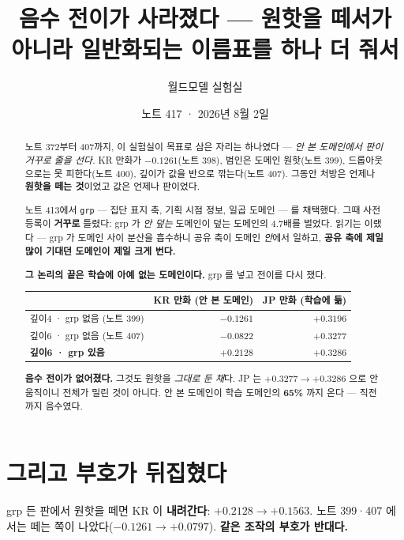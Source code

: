 \documentclass[11pt]{article}
\begin{document}
\title{음수 전이가 사라졌다 --- 원핫을 떼서가 아니라 일반화되는 이름표를 하나 더 줘서}
\author{월드모델 실험실}
\date{노트 417 · 2026년 8월 2일}
\maketitle

\begin{abstract}
노트 372부터 407까지, 이 실험실이 목표로 삼은 자리는 하나였다 --- \emph{안 본
도메인에서 판이 거꾸로 줄을 선다.} KR 만화가 $-0.1261$(노트 398), 범인은
도메인 원핫(노트 399), 드롭아웃으로는 못 피한다(노트 400), 깊이가 값을 반으로
깎는다(노트 407). 그동안 처방은 언제나 \textbf{원핫을 떼는 것}이었고 값은
언제나 판이었다.

노트 413에서 \texttt{grp} --- 집단 표지 축, 기획 시점 정보, 일곱 도메인 ---
를 채택했다. 그때 사전 등록이 \textbf{거꾸로} 틀렸다: grp 가 \emph{안 덮는}
도메인이 덮는 도메인의 4.7배를 벌었다. 읽기는 이랬다 --- grp 가 도메인 사이
분산을 흡수하니 공유 축이 도메인 \emph{안}에서 일하고, \textbf{공유 축에
제일 많이 기대던 도메인이 제일 크게 번다.}

\textbf{그 논리의 끝은 학습에 아예 없는 도메인이다.} grp 를 넣고 전이를
다시 쟀다.

\begin{center}
\begin{tabular}{lrr}
\hline
 & KR 만화 (\textbf{안 본 도메인}) & JP 만화 (학습에 듦) \\
\hline
깊이4 · grp 없음 (노트 399) & $-0.1261$ & $+0.3196$ \\
깊이6 · grp 없음 (노트 407) & $-0.0822$ & $+0.3277$ \\
\textbf{깊이6 · grp 있음} & $\mathbf{+0.2128}$ & $+0.3286$ \\
\hline
\end{tabular}
\end{center}

\textbf{음수 전이가 없어졌다.} 그것도 원핫을 \emph{그대로 둔 채}다. JP 는
$+0.3277 \to +0.3286$ 으로 안 움직이니 전체가 밀린 것이 아니다. 안 본
도메인이 학습 도메인의 \textbf{65\%} 까지 온다 --- 직전까지 음수였다.
\end{abstract}

\section{그리고 부호가 뒤집혔다}

grp 든 판에서 원핫을 떼면 KR 이 \textbf{내려간다}: $+0.2128 \to +0.1563$.
노트 399·407 에서는 떼는 쪽이 나았다($-0.1261 \to +0.0797$). \textbf{같은
조작의 부호가 반대다.}
\end{document}
